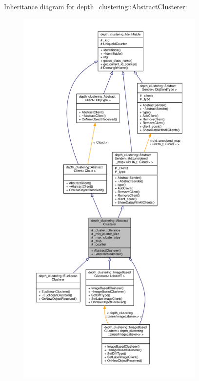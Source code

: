 Inheritance diagram for depth\+\_\+clustering\+:\+:Abstract\+Clusterer\+:\nopagebreak
\begin{figure}[H]
\begin{center}
\leavevmode
\includegraphics[height=550pt]{classdepth__clustering_1_1AbstractClusterer__inherit__graph}
\end{center}
\end{figure}


